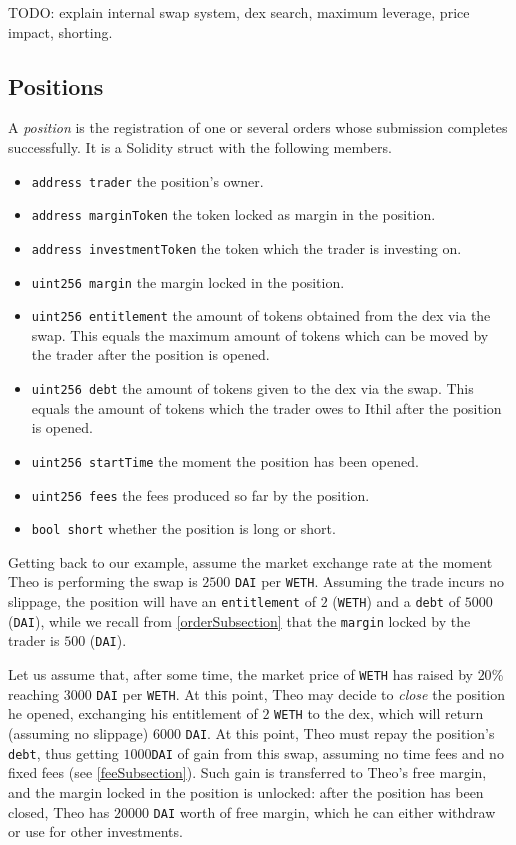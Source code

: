 \documentclass [10pt, fancyhdr, twoside] {article}
\begin{document}
TODO: explain internal swap system, dex search, maximum leverage, price impact, shorting.
 
\subsection{Positions}\label{positionSubsection}
A \textit{position} is the registration of one or several orders whose submission completes successfully. It is a Solidity struct with the following members.
\begin{itemize}
\item \verb|address trader| the position's owner.
\item \verb|address marginToken| the token locked as margin in the position.
\item \verb|address investmentToken| the token which the trader is investing on.
\item \verb|uint256 margin| the margin locked in the position.
\item \verb|uint256 entitlement| the amount of tokens obtained from the dex via the swap. This equals the maximum amount of tokens which can be moved by the trader after the position is opened.
\item \verb|uint256 debt| the amount of tokens given to the dex via the swap. This equals the amount of tokens which the trader owes to Ithil after the position is opened.
\item \verb|uint256 startTime| the moment the position has been opened.
\item \verb|uint256 fees| the fees produced so far by the position.
\item \verb|bool short| whether the position is long or short.
\end{itemize}
Getting back to our example, assume the market exchange rate at the moment Theo is performing the swap is $2500$ \verb|DAI| per \verb|WETH|. Assuming the trade incurs no slippage, the position will have an \verb|entitlement| of $2$ (\verb|WETH|) and a \verb|debt| of $5000$ (\verb|DAI|), while we recall from \ref{orderSubsection} that the \verb|margin| locked by the trader is $500$ (\verb|DAI|).

Let us assume that, after some time, the market price of \verb|WETH| has raised by $20$\% reaching $3000$ \verb|DAI| per \verb|WETH|. At this point, Theo may decide to \emph{close} the position he opened, exchanging his entitlement of $2$ \verb|WETH| to the dex, which will return (assuming no slippage) $6000$ \verb|DAI|. At this point, Theo must repay the position's \verb|debt|, thus getting $1000$\verb|DAI| of gain from this swap, assuming no time fees and no fixed fees (see \ref{feeSubsection}). Such gain is transferred to Theo's free margin, and the margin locked in the position is unlocked: after the position has been closed, Theo has $20000$ \verb|DAI| worth of free margin, which he can either withdraw or use for other investments.
\end{document}
